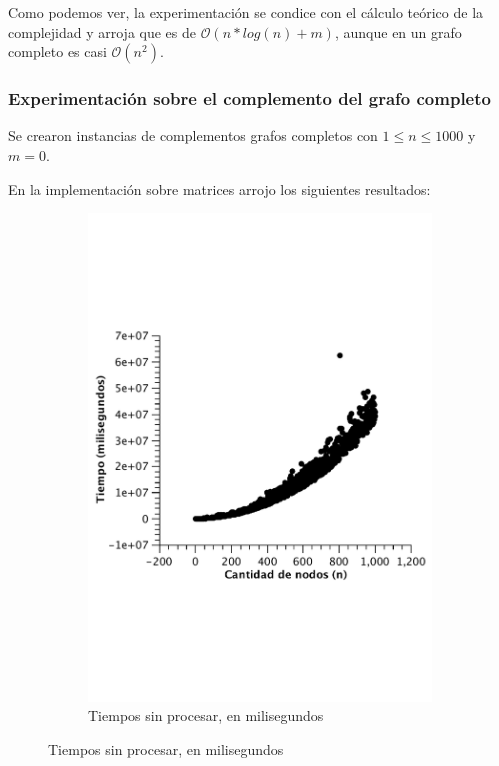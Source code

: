 Como podemos ver, la experimentación se condice con el cálculo teórico de la complejidad y arroja que es de $\mathcal{O}(n*log(n) + m)$, aunque en un grafo completo es casi $\mathcal{O}(n^2)$.



\subsubsection{Experimentación sobre el complemento del grafo completo}

Se crearon instancias de complementos grafos completos con $1 \leq n \leq 1000$ y $m = 0$.

En la implementación sobre matrices arrojo los siguientes resultados:\\ 

\begin{figure}[H]
        \centering
\begin{subfigure}[b]{0.25\textwidth}
                \includegraphics[width=\textwidth]{imagenes/vacio-matriz-1.pdf}
                \caption{Tiempos sin procesar, en milisegundos}
        \end{subfigure}%


\end{figure}
